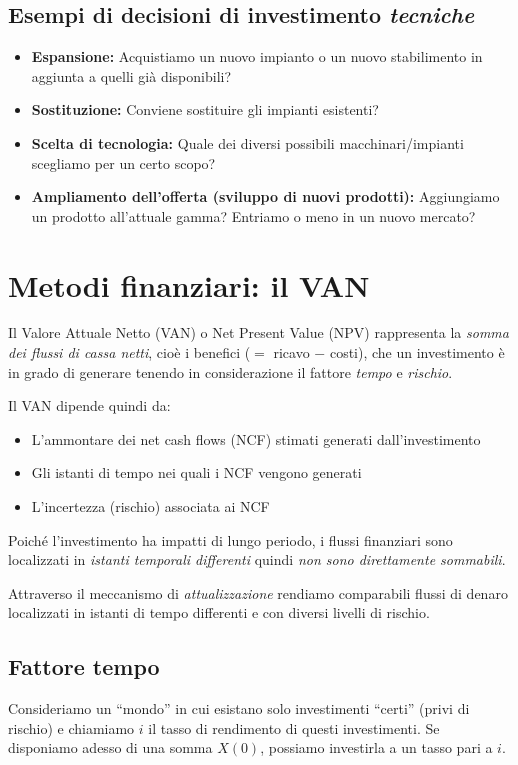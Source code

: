 \subsection{Esempi di decisioni di investimento \emph{tecniche}}
\begin{itemize}
    \item \textbf{Espansione:}
    Acquistiamo un nuovo impianto o un nuovo stabilimento in aggiunta a quelli già disponibili?
    \item \textbf{Sostituzione:}
    Conviene sostituire gli impianti esistenti?
    \item \textbf{Scelta di tecnologia:}
    Quale dei diversi possibili macchinari/impianti scegliamo per un certo scopo?
    \item \textbf{Ampliamento dell’offerta (sviluppo di nuovi prodotti):}
    Aggiungiamo un prodotto all’attuale gamma?
    Entriamo o meno in un nuovo mercato?
\end{itemize}

\section{Metodi finanziari: il VAN}
Il Valore Attuale Netto (\gls{VAN}) o Net Present Value (NPV) rappresenta la
\emph{somma dei flussi di cassa netti}, cioè i benefici ($=$ ricavo $-$ costi), che un investimento
è in grado di generare tenendo in considerazione il fattore \emph{tempo} e \emph{rischio}.

Il \gls{VAN} dipende quindi da:
\begin{itemize}
    \item L’ammontare dei net cash flows (\gls{NCF}) stimati generati dall’investimento
    \item Gli istanti di tempo nei quali i \gls{NCF} vengono generati
    \item L’incertezza (rischio) associata ai \gls{NCF}
\end{itemize}

Poiché l’investimento ha impatti di lungo periodo, i flussi finanziari sono
localizzati in \emph{istanti temporali differenti} quindi \emph{non sono direttamente sommabili}.

Attraverso il meccanismo di \emph{attualizzazione} rendiamo comparabili flussi di denaro
localizzati in istanti di tempo differenti e con diversi livelli di rischio.

\subsection{Fattore tempo}
Consideriamo un ``mondo'' in cui esistano solo investimenti ``certi'' (privi di rischio)
e chiamiamo $i$ il tasso di rendimento di questi investimenti.
Se disponiamo adesso di una somma $X(0)$, possiamo investirla a un tasso pari a $i$.


